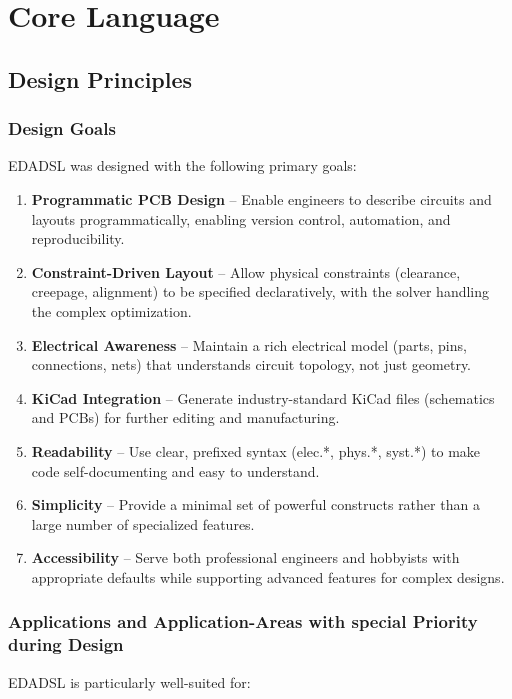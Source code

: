 \part{Core Language}
\chapter{Design Principles}
\section{Design Goals}
EDADSL was designed with the following primary goals:

\begin{enumerate}
\item \textbf{Programmatic PCB Design} -- Enable engineers to describe circuits and layouts programmatically, enabling version control, automation, and reproducibility.

\item \textbf{Constraint-Driven Layout} -- Allow physical constraints (clearance, creepage, alignment) to be specified declaratively, with the solver handling the complex optimization.

\item \textbf{Electrical Awareness} -- Maintain a rich electrical model (parts, pins, connections, nets) that understands circuit topology, not just geometry.

\item \textbf{KiCad Integration} -- Generate industry-standard KiCad files (schematics and PCBs) for further editing and manufacturing.

\item \textbf{Readability} -- Use clear, prefixed syntax (elec.*, phys.*, syst.*) to make code self-documenting and easy to understand.

\item \textbf{Simplicity} -- Provide a minimal set of powerful constructs rather than a large number of specialized features.

\item \textbf{Accessibility} -- Serve both professional engineers and hobbyists with appropriate defaults while supporting advanced features for complex designs.
\end{enumerate}

\section{Applications and Application-Areas with special Priority during Design}
EDADSL is particularly well-suited for:


